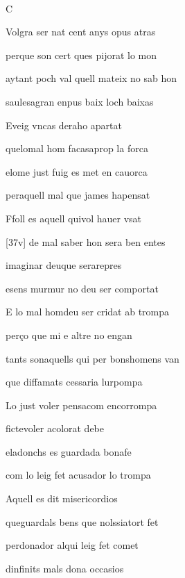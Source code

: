 \documentclass[12pt]{article}
\renewcommand{\espaiAbansEtiquetaPoema}{\vspace{0ex}}
\begin{document}
\begin{estrofa}

\espaiAbansEtiquetaPoema

\\

\begin{rubrica}

C

\end{rubrica}

\end{estrofa}


\begin{estrofa}

 Volgra ser nat cent anys opus atras

 perque son cert ques pijorat lo mon

 aytant poch val quell mateix no sab hon

 saulesagran enpus baix loch baixas

 Eveig vncas deraho apartat

 quelomal hom facasaprop la forca

 elome just fuig es met en cauorca

 peraquell mal que james hapensat

\end{estrofa}



\begin{estrofa}

 Ffoll es aquell quivol hauer vsat

 [37v] de mal saber hon sera ben entes

 imaginar deuque serarepres

 esens murmur no deu ser comportat

 E lo mal homdeu ser cridat ab trompa

 per\c{c}o que mi e altre no engan

 tants sonaquells qui per bonshomens van

 que diffamats cessaria lurpompa

\end{estrofa}



\begin{estrofa}

 Lo just voler pensacom encorrompa

 fictevoler acolorat debe

 eladonchs es guardada bonafe

 com lo leig fet acusador lo trompa

 Aquell es dit misericordios

 queguardals bens que nolssiatort fet

 perdonador  alqui leig fet comet

 dinfinits mals dona occasios

\end{estrofa}
\end{document}
